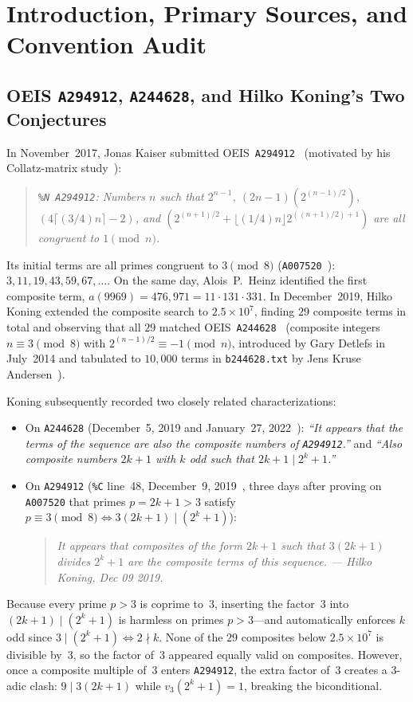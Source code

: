 \documentclass[11pt]{article}
\theoremstyle{definition}
\newcommand{\seq}[1]{\texttt{#1}}
\begin{document}
\section{Introduction, Primary Sources, and Convention Audit}

\subsection{OEIS \texorpdfstring{\seq{A294912}}{A294912}, \texorpdfstring{\seq{A244628}}{A244628}, and Hilko Koning's Two Conjectures}

In November~2017, Jonas Kaiser submitted OEIS~\seq{A294912}~\cite{oeis294912} (motivated by his Collatz-matrix study~\cite{kaiser2016}):
\begin{quote}\itshape
\texttt{\%N A294912}: Numbers $n$ such that $2^{n-1}$, $(2n - 1)(2^{(n-1)/2})$, $(4\lceil(3/4)n\rceil - 2)$, and $(2^{(n+1)/2} + \lfloor(1/4)n\rfloor 2^{((n+1)/2)+1})$ are all congruent to $1 \pmod n$.
\end{quote}
Its initial terms are all primes congruent to $3 \pmod 8$ (\seq{A007520}~\cite{oeis007520}): $3, 11, 19, 43, 59, 67, \dots$. On the same day, Alois~P.\ Heinz identified the first composite term, $a(9969) = 476{,}971 = 11 \cdot 131 \cdot 331$. In December~2019, Hilko Koning extended the composite search to $2.5 \times 10^7$, finding $29$ composite terms in total and observing that all $29$ matched OEIS~\seq{A244628}~\cite{oeis244628} (composite integers $n \equiv 3 \pmod 8$ with $2^{(n-1)/2} \equiv -1 \pmod n$, introduced by Gary Detlefs in July~2014 and tabulated to $10{,}000$ terms in \texttt{b244628.txt} by Jens Kruse Andersen~\cite{b244628}).

Koning subsequently recorded two closely related characterizations:
\begin{itemize}
\item On \seq{A244628} (December~5, 2019 and January~27, 2022~\cite{oeis244628}):
  \emph{``It appears that the terms of the sequence are also the composite numbers of \seq{A294912}.''} and \emph{``Also composite numbers $2k+1$ with $k$ odd such that $2k+1 \mid 2^k+1$.''}
\item On \seq{A294912} (\texttt{\%C} line~48, December~9, 2019~\cite{oeis294912}, three days after proving on \seq{A007520} that primes $p = 2k+1 > 3$ satisfy $p \equiv 3 \pmod 8 \iff 3(2k+1) \mid (2^k+1)$):
  \begin{quote}\itshape
  It appears that composites of the form $2k+1$ such that $3(2k+1)$ divides $2^k+1$ are the composite terms of this sequence. --- \emph{Hilko Koning}, Dec 09 2019.
  \end{quote}
\end{itemize}
Because every prime $p > 3$ is coprime to~$3$, inserting the factor~$3$ into $(2k+1) \mid (2^k+1)$ is harmless on primes $p > 3$---and automatically enforces $k$ odd since $3 \mid (2^k + 1) \iff 2 \nmid k$. None of the $29$ composites below $2.5 \times 10^7$ is divisible by~$3$, so the factor of~$3$ appeared equally valid on composites. However, once a composite multiple of~$3$ enters \seq{A294912}, the extra factor of~$3$ creates a $3$-adic clash: $9 \mid 3(2k+1)$ while $v_3(2^k+1) = 1$, breaking the biconditional.
\end{document}
